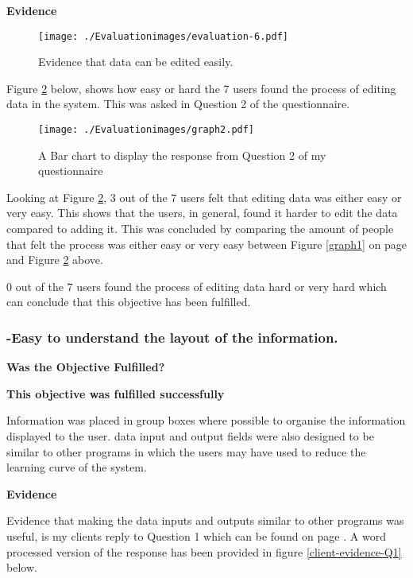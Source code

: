 \textbf{Evidence} \newline

\begin{figure}[H]
\caption{Evidence that data can be edited easily.} \label{fig:evaluation-6}
\hfill\texttt{[image: ./Evaluationimages/evaluation-6.pdf]}
\end{figure}

Figure \ref{graph2} below, shows how easy or hard the 7 users found the process of editing data in the system. This was asked in Question 2 of the questionnaire.

\begin{figure}[H]
\caption{A Bar chart to display the response from Question 2 of my questionnaire} \label{graph2}
\hfill\texttt{[image: ./Evaluationimages/graph2.pdf]}
\end{figure}

Looking at Figure \ref{graph2}, 3 out of the 7 users felt that editing data was either easy or very easy. This shows that the users, in general, found it harder to edit the data compared to adding it. This was concluded by comparing the amount of people that felt the process was either easy or very easy between Figure \ref{graph1} on page \pageref{graph1} and Figure \ref{graph2} above.

0 out of the 7 users found the process of editing data hard or very hard which can conclude that this objective has been fulfilled.




\pagebreak
\subsubsection{-Easy to understand the layout of the information.}
\textbf{Was the Objective Fulfilled?} \newline

\textbf{\large{This objective was fulfilled successfully}}

Information was placed in group boxes where possible to organise the information displayed to the user. data input and output fields were also designed to be similar to other programs in which the users may have used to reduce the learning curve of the system. 


\textbf{Evidence} \newline

Evidence that making the data inputs and outputs similar to other programs was useful, is my clients reply to Question 1 which can be found on page \pageref{Client-Q1}. A word processed version of the response has been provided in figure \ref{client-evidence-Q1} below. \newline

